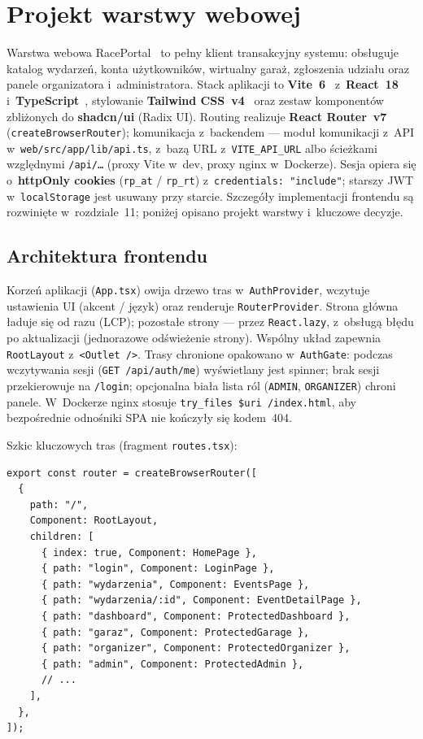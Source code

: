 \documentclass{sprz}
\begin{document}
\section{Projekt warstwy webowej}
\label{sec:figma}

Warstwa webowa RacePortal~\cite{react:docs} to pełny klient transakcyjny systemu: obsługuje katalog wydarzeń, konta użytkowników, wirtualny garaż, zgłoszenia udziału oraz panele organizatora i~administratora. Stack aplikacji to \textbf{Vite~6}~\cite{vite:docs} z~\textbf{React~18} i~\textbf{TypeScript}~\cite{typescript:docs}, stylowanie \textbf{Tailwind CSS~v4}~\cite{tailwind:docs} oraz zestaw komponentów zbliżonych do \textbf{shadcn/ui} (Radix UI). Routing realizuje \textbf{React Router~v7} (\texttt{createBrowserRouter}); komunikacja z~backendem --- moduł komunikacji z~API w~\texttt{web/\allowbreak src/\allowbreak app/\allowbreak lib/\allowbreak api.ts}, z~bazą URL z~\texttt{VITE\_API\_URL} albo ścieżkami względnymi \texttt{/api/\ldots} (proxy Vite w~dev, proxy nginx w~Dockerze). Sesja opiera się o~\textbf{httpOnly cookies} (\texttt{rp\_at} / \texttt{rp\_rt}) z~\texttt{credentials: "include"}; starszy JWT w~\texttt{localStorage} jest usuwany przy starcie. Szczegóły implementacji frontendu są rozwinięte w~rozdziale~11; poniżej opisano projekt warstwy i~kluczowe decyzje.

\subsection*{Architektura frontendu}

Korzeń aplikacji (\texttt{App.tsx}) owija drzewo tras w~\texttt{AuthProvider},
wczytuje ustawienia UI (akcent / język) oraz renderuje \texttt{Router\-Provider}.
Strona główna ładuje się od razu (LCP); pozostałe strony --- przez \texttt{React.lazy},
z~obsługą błędu po aktualizacji (jednorazowe odświeżenie strony).
Wspólny układ zapewnia \texttt{RootLayout} z~\texttt{<Outlet~/>}.
Trasy chronione opakowano w~\texttt{AuthGate}: podczas wczytywania sesji
(\texttt{GET /api/\allowbreak auth/\allowbreak me}) wyświetlany jest spinner;
brak sesji przekierowuje na \texttt{/login};
opcjonalna biała lista ról (\texttt{ADMIN}, \texttt{ORGANIZER}) chroni panele.
W~Dockerze nginx stosuje \texttt{try\_files \$uri /index.html},
aby bezpośrednie odnośniki SPA nie kończyły się kodem~404.

Szkic kluczowych tras (fragment \texttt{routes.tsx}):

\begin{lstlisting}[caption={Fragment drzewa tras React Router (katalog, auth, panele).}, label={lst:web-routes}]
export const router = createBrowserRouter([
  {
    path: "/",
    Component: RootLayout,
    children: [
      { index: true, Component: HomePage },
      { path: "login", Component: LoginPage },
      { path: "wydarzenia", Component: EventsPage },
      { path: "wydarzenia/:id", Component: EventDetailPage },
      { path: "dashboard", Component: ProtectedDashboard },
      { path: "garaz", Component: ProtectedGarage },
      { path: "organizer", Component: ProtectedOrganizer },
      { path: "admin", Component: ProtectedAdmin },
      // ...
    ],
  },
]);
\end{lstlisting}
\end{document}
